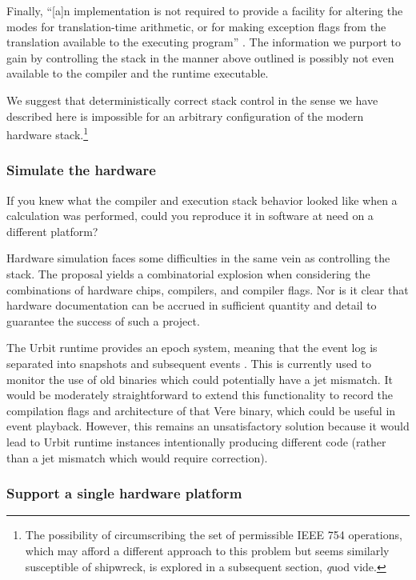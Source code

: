 \documentclass[twoside]{article}
\begin{document}
Finally, “[a]n implementation is not required to provide a facility for altering the modes for translation-time arithmetic, or for making exception flags from the translation available to the executing program” \citep[p.~200]{Jones2008}.  The information we purport to gain by controlling the stack in the manner above outlined is possibly not even available to the compiler and the runtime executable.

We suggest that deterministically correct stack control in the sense we have described here is impossible for an arbitrary configuration of the modern hardware stack.\footnote{The possibility of circumscribing the set of permissible IEEE 754 operations, which may afford a different approach to this problem but seems similarly susceptible of shipwreck, is explored in a subsequent section, {\emph quod vide}.}

\subsubsection{Simulate the hardware}

If you knew what the compiler and execution stack behavior looked like when a calculation was performed, could you reproduce it in software at need on a different platform?

Hardware simulation faces some difficulties in the same vein as controlling the stack.  The proposal yields a combinatorial explosion when considering the combinations of hardware chips, compilers, and compiler flags.  Nor is it clear that hardware documentation can be accrued in sufficient quantity and detail to guarantee the success of such a project.

The Urbit runtime provides an epoch system, meaning that the event log is separated into snapshots and subsequent events \citep{UrbitEpoch}.  This is currently used to monitor the use of old binaries which could potentially have a jet mismatch.  It would be moderately straightforward to extend this functionality to record the compilation flags and architecture of that Vere binary, which could be useful in event playback.  However, this remains an unsatisfactory solution because it would lead to Urbit runtime instances intentionally producing different code (rather than a jet mismatch which would require correction).

\subsubsection{Support a single hardware platform}
\end{document}
